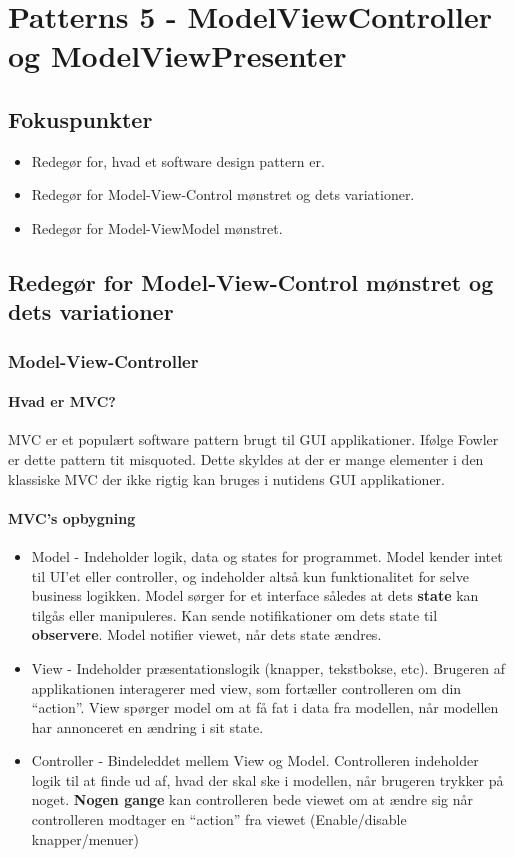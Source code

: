 \section{Patterns 5 - ModelViewController og ModelViewPresenter}

\subsection{Fokuspunkter}

\begin{itemize}
	\item Redegør for, hvad et software design pattern er.
	\item Redegør for Model-View-Control mønstret og dets variationer.
	\item Redegør for Model-ViewModel mønstret.
\end{itemize}



\subsection{Redegør for Model-View-Control mønstret og dets variationer}
\subsubsection{Model-View-Controller}
\paragraph{Hvad er MVC?}
MVC er et populært software pattern brugt til GUI applikationer. Ifølge Fowler er dette pattern tit misquoted. Dette skyldes at der er mange elementer i den klassiske MVC der ikke rigtig kan bruges i nutidens GUI applikationer.

\paragraph{MVC's opbygning}
\begin{itemize}
	\item Model - Indeholder logik, data og states for programmet. Model kender intet til UI’et eller controller, og indeholder altså kun funktionalitet for selve business logikken. Model sørger for et interface således at dets \textbf{state} kan tilgås eller manipuleres. Kan sende notifikationer om dets state til \textbf{observere}. Model notifier viewet, når dets state ændres.
	
	\item View - Indeholder præsentationslogik (knapper, tekstbokse, etc). Brugeren af applikationen interagerer med view, som fortæller controlleren om din “action”. View spørger model om at få fat i data fra modellen, når modellen har annonceret en ændring i sit state.
	
	\item Controller - Bindeleddet mellem View og Model. Controlleren indeholder logik til at finde ud af, hvad der skal ske i modellen, når brugeren trykker på noget. \textbf{Nogen gange} kan controlleren bede viewet om at ændre sig når controlleren modtager en “action” fra viewet (Enable/disable knapper/menuer)	
\end{itemize}

